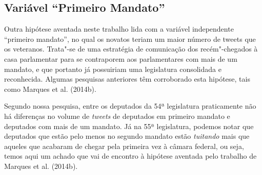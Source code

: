 \subsection{Variável ``Primeiro Mandato''}

Outra hipótese aventada neste trabalho lida com a variável independente
``primeiro mandato'', no qual os novatos teriam um maior número de
tweets que os veteranos. Trata"-se de uma estratégia de comunicação dos
recém"-chegados à casa parlamentar para se contraporem aos parlamentares
com mais de um mandato, e que portanto já possuiriam uma legislatura
consolidada e reconhecida. Algumas pesquisas anteriores têm corroborado
esta hipótese, tais como Marques et al. (2014b).

Segundo nossa pesquisa, entre os deputados da 54ª legislatura
praticamente não há diferenças no volume de \emph{tweets} de deputados
em primeiro mandato e deputados com mais de um mandato. Já na 55ª
legislatura, podemos notar que deputados que estão pelo menos no segundo
mandato estão \emph{tuitando} mais que aqueles que acabaram de chegar
pela primeira vez à câmara federal, ou seja, temos aqui um achado que
vai de encontro à hipótese aventada pelo trabalho de Marques et al.
(2014b).

